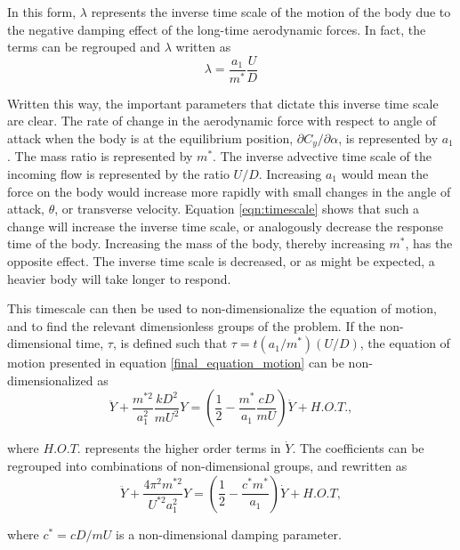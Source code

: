  In this form, $\lambda$ represents the inverse time scale of the motion of the body due to the negative damping effect of the long-time aerodynamic forces. In fact, the terms can be regrouped and $\lambda$ written as
 \begin{equation}
   \label{eqn:timescale}
   \lambda = \frac{a_1}{m^*}\frac{U}{D}
 \end{equation}
 
 Written this way, the important parameters that dictate this inverse time scale are clear. The rate of change in the aerodynamic force with respect to angle of attack when the body is at the equilibrium position, $\partial C_y/\partial \alpha$, is represented by $a_1$. The mass ratio is represented by $m^*$. The inverse advective time scale of the incoming flow is represented by the ratio $U/D$. Increasing $a_1$ would mean the force on the body would increase more rapidly with small changes in the angle of attack, $\theta$, or transverse velocity. Equation \ref{eqn:timescale} shows that such a change will increase the inverse time scale, or analogously decrease the response time of the body. Increasing the mass of the body, thereby increasing $m^*$, has the opposite effect. The inverse time scale is decreased, or as might be expected, a heavier body will take longer to respond.
 
 This timescale can then be used to non-dimensionalize the equation of motion, and to find the relevant dimensionless groups of the problem. If the non-dimensional time, $\tau$, is defined such that $\tau=t(a_1/m^*)(U/D)$, the equation of motion presented in equation \ref{final_equation_motion} can be non-dimensionalized as
 \begin{equation}
   \label{eqn:eom_nondim}
   \ddot{Y} + \frac{m^{*2}}{a_1^2}\frac{kD^2}{mU^2}Y = \left(\frac{1}{2} - \frac{m^*}{a_1}\frac{cD}{mU}\right)\dot{Y} + H.O.T.,
 \end{equation}
 
 where $H.O.T.$ represents the higher order terms in $\dot{Y}$. The coefficients can be regrouped into combinations of non-dimensional groups, and rewritten as
 \begin{equation}
   \label{eqn:eom_nondim_regroup}
   \ddot{Y} + \frac{4\pi^{2}m^{*2}}{U^{*2}a_1^2}Y = \left(\frac{1}{2} - \frac{c^*m^*}{a_1}\right)\dot{Y} + H.O.T,
 \end{equation}
 
 where $c^*=cD/mU$ is a non-dimensional damping parameter.
 
